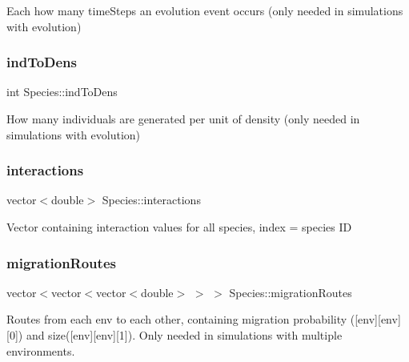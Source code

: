 Each how many time\+Steps an evolution event occurs (only needed in simulations with evolution) \hypertarget{classSpecies_a3a11f42cb341349dadb706fff06f301d}{}\label{classSpecies_a3a11f42cb341349dadb706fff06f301d} 
\subsubsection{\texorpdfstring{ind\+To\+Dens}{indToDens}}
{\footnotesize\ttfamily int Species\+::ind\+To\+Dens\hspace{0.3cm}{\ttfamily [protected]}}

How many individuals are generated per unit of density (only needed in simulations with evolution) \hypertarget{classSpecies_a2ea9ab3b36448426b237f40dd4a1a18d}{}\label{classSpecies_a2ea9ab3b36448426b237f40dd4a1a18d} 
\subsubsection{\texorpdfstring{interactions}{interactions}}
{\footnotesize\ttfamily vector$<$double$>$ Species\+::interactions\hspace{0.3cm}{\ttfamily [protected]}}

Vector containing interaction values for all species, index = species ID \hypertarget{classSpecies_a732dd85466e7156e8e51c7b44ea00f24}{}\label{classSpecies_a732dd85466e7156e8e51c7b44ea00f24} 
\subsubsection{\texorpdfstring{migration\+Routes}{migrationRoutes}}
{\footnotesize\ttfamily vector$<$vector$<$vector$<$double$>$ $>$ $>$ Species\+::migration\+Routes\hspace{0.3cm}{\ttfamily [protected]}}

Routes from each env to each other, containing migration probability (\mbox{[}env\mbox{]}\mbox{[}env\mbox{]}\mbox{[}0\mbox{]}) and size(\mbox{[}env\mbox{]}\mbox{[}env\mbox{]}\mbox{[}1\mbox{]}). Only needed in simulations with multiple environments. \hypertarget{classSpecies_a11e7aac3c4a85723e8a9d00d00452508}{}\label{classSpecies_a11e7aac3c4a85723e8a9d00d00452508} 
